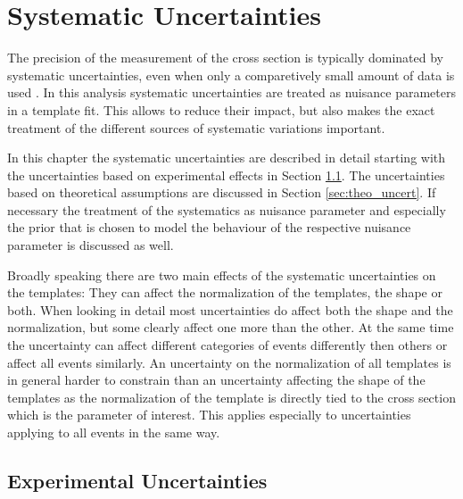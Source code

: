 
\chapter{Systematic Uncertainties}
\label{sec:syst_uncert}

The precision of the measurement of the \ttbar cross section is typically dominated by systematic uncertainties,
even when only a comparetively small amount of data is used \cite{Khachatryan:2015uqb}. In this analysis systematic uncertainties are treated as nuisance parameters in a
template fit. This allows to reduce their impact, but also makes the exact treatment of the different sources of systematic variations important. 

In this chapter the systematic uncertainties are described in detail starting with the uncertainties based on experimental effects in Section \ref{sec:exp_uncert}.
The uncertainties based on theoretical assumptions are discussed in Section \ref{sec:theo_uncert}. If necessary the treatment of the systematics as nuisance
parameter and especially the prior that is chosen to model the behaviour of the respective nuisance parameter is discussed as well.

Broadly speaking there are two main effects of the systematic uncertainties on the templates: They can affect the normalization of the templates, the shape or both.
When looking in detail most uncertainties do affect both the shape and the normalization, but some clearly affect one more than the other.
At the same time the uncertainty can affect different categories of events differently then others or affect all events similarly.
An uncertainty on the normalization of all templates is in general harder to constrain than an uncertainty affecting the shape of the templates as the normalization of the
\ttbar template is directly tied to the cross section which is the parameter of interest. This applies especially to uncertainties applying to all events in the same way.


\section{Experimental Uncertainties}
\label{sec:exp_uncert}

